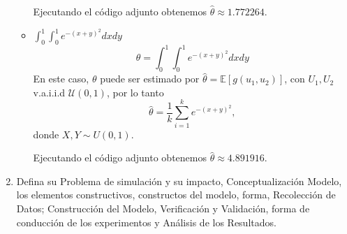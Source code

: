 \documentclass[12pt]{article}
\begin{document}
\begin{enumerate}
\begin{itemize}
            Ejecutando el código adjunto obtenemos $\hat{\theta} \approx 1.772264$. \bigskip                        
              
          \item $\displaystyle \int_{0}^{1}\int_{0}^{1}e^{-(x+y)^2}dxdy$
            \begin{equation}
                \theta = \int_{0}^{1}\int_{0}^{1}e^{-(x+y)^2}dxdy
            \end{equation}
            En este caso, $\theta$ puede ser estimado por $\hat{\theta} = \mathbb{E}[g(u_1, u_2)]$,
            con $U_1, U_2$ v.a.i.i.d $\mathcal{U}(0,1)$, por lo tanto
            \begin{equation}
                \hat{\theta} = \frac1k \sum_{i=1}^ke^{-(x+y)^2},
            \end{equation}
            donde $X, Y \sim U(0,1)$.
            
            Ejecutando el código adjunto obtenemos $\hat{\theta} \approx 4.891916$.                        
            
        \end{itemize}
      \item  Defina su Problema de simulación y su impacto, Conceptualización
        Modelo, los elementos constructivos, constructos del modelo, forma,
        Recolección de Datos; Construcción del Modelo, Verificación y Validación,
        forma de conducción de los experimentos y Análisis de los Resultados.


\end{enumerate}
\end{document}
